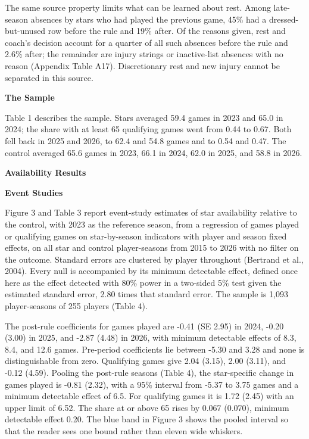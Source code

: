 \documentclass[12pt]{article}
\newcommand{\lone}[1]{\par\medskip\noindent\begin{center}\textbf{#1}\end{center}\par\nopagebreak}
\newcommand{\ltwo}[1]{\par\medskip\noindent\textbf{#1}\par\nopagebreak}
\begin{document}
The same source property limits what can be learned about rest. Among late-season absences by stars who had played the previous game, 45\% had a dressed-but-unused row before the rule and 19\% after. Of the reasons given, rest and coach's decision account for a quarter of all such absences before the rule and 2.6\% after; the remainder are injury strings or inactive-list absences with no reason (Appendix Table A17). Discretionary rest and new injury cannot be separated in this source.


\ltwo{The Sample}


Table 1 describes the sample. Stars averaged 59.4 games in 2023 and 65.0 in 2024; the share with at least 65 qualifying games went from 0.44 to 0.67. Both fell back in 2025 and 2026, to 62.4 and 54.8 games and to 0.54 and 0.47. The control averaged 65.6 games in 2023, 66.1 in 2024, 62.0 in 2025, and 58.8 in 2026.


\lone{Availability Results}



\ltwo{Event Studies}


Figure 3 and Table 3 report event-study estimates of star availability relative to the control, with 2023 as the reference season, from a regression of games played or qualifying games on star-by-season indicators with player and season fixed effects, on all star and control player-seasons from 2015 to 2026 with no filter on the outcome. Standard errors are clustered by player throughout (Bertrand et al., 2004). Every null is accompanied by its minimum detectable effect, defined once here as the effect detected with 80\% power in a two-sided 5\% test given the estimated standard error, 2.80 times that standard error. The sample is 1,093 player-seasons of 255 players (Table 4).

The post-rule coefficients for games played are -0.41 (SE 2.95) in 2024, -0.20 (3.00) in 2025, and -2.87 (4.48) in 2026, with minimum detectable effects of 8.3, 8.4, and 12.6 games. Pre-period coefficients lie between -5.30 and 3.28 and none is distinguishable from zero. Qualifying games give 2.04 (3.15), 2.00 (3.11), and -0.12 (4.59). Pooling the post-rule seasons (Table 4), the star-specific change in games played is -0.81 (2.32), with a 95\% interval from -5.37 to 3.75 games and a minimum detectable effect of 6.5. For qualifying games it is 1.72 (2.45) with an upper limit of 6.52. The share at or above 65 rises by 0.067 (0.070), minimum detectable effect 0.20. The blue band in Figure 3 shows the pooled interval so that the reader sees one bound rather than eleven wide whiskers.
\end{document}
